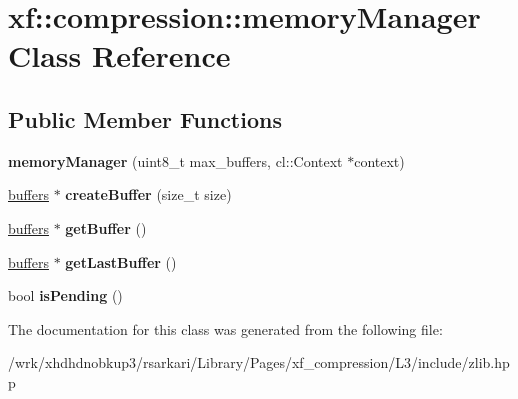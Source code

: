 \hypertarget{classxf_1_1compression_1_1memoryManager}{\section{xf\-:\-:compression\-:\-:memory\-Manager Class Reference}
\label{classxf_1_1compression_1_1memoryManager}
}
\subsection*{Public Member Functions}
\begin{DoxyCompactItemize}
\item 
\hypertarget{classxf_1_1compression_1_1memoryManager_a06244d0aae5734e40b545f9f1ce5b8ca}{{\bfseries memory\-Manager} (uint8\-\_\-t max\-\_\-buffers, cl\-::\-Context $\ast$context)}\label{classxf_1_1compression_1_1memoryManager_a06244d0aae5734e40b545f9f1ce5b8ca}

\item 
\hypertarget{classxf_1_1compression_1_1memoryManager_a41ec4b8844024a9681b5b2169d409498}{\hyperlink{structxf_1_1compression_1_1buffers}{buffers} $\ast$ {\bfseries create\-Buffer} (size\-\_\-t size)}\label{classxf_1_1compression_1_1memoryManager_a41ec4b8844024a9681b5b2169d409498}

\item 
\hypertarget{classxf_1_1compression_1_1memoryManager_aa556e1b841b4c2caf857dcca3cf61e2b}{\hyperlink{structxf_1_1compression_1_1buffers}{buffers} $\ast$ {\bfseries get\-Buffer} ()}\label{classxf_1_1compression_1_1memoryManager_aa556e1b841b4c2caf857dcca3cf61e2b}

\item 
\hypertarget{classxf_1_1compression_1_1memoryManager_a4f063f42fc29f958f793b68e197afe59}{\hyperlink{structxf_1_1compression_1_1buffers}{buffers} $\ast$ {\bfseries get\-Last\-Buffer} ()}\label{classxf_1_1compression_1_1memoryManager_a4f063f42fc29f958f793b68e197afe59}

\item 
\hypertarget{classxf_1_1compression_1_1memoryManager_a5dc666affd08f2316ebb6bf5033c647d}{bool {\bfseries is\-Pending} ()}\label{classxf_1_1compression_1_1memoryManager_a5dc666affd08f2316ebb6bf5033c647d}

\end{DoxyCompactItemize}


The documentation for this class was generated from the following file\-:\begin{DoxyCompactItemize}
\item 
/wrk/xhdhdnobkup3/rsarkari/\-Library/\-Pages/xf\-\_\-compression/\-L3/include/zlib.\-hpp\end{DoxyCompactItemize}
